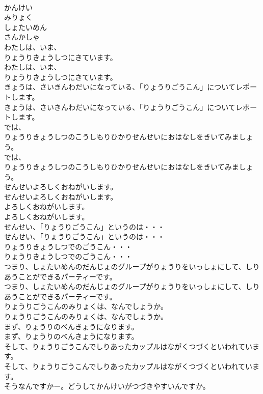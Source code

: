 \documentclass[8pt]{extreport}
\begin{document}
\begin{CJK}{UTF8}{min}
\\	かんけい
\\	みりょく
\\	しょたいめん
\\	さんかしゃ
\\	わたしは、いま、
\\	りょうりきょうしつにきています。
\\	わたしは、いま、
\\	りょうりきょうしつにきています。
\\	きょうは、さいきんわだいになっている、「りょうりごうこん」についてレポートします。
\\	きょうは、さいきんわだいになっている、「りょうりごうこん」についてレポートします。
\\	では、
\\	りょうりきょうしつのこうしもりひかりせんせいにおはなしをきいてみましょう。
\\	では、
\\	りょうりきょうしつのこうしもりひかりせんせいにおはなしをきいてみましょう。
\\	せんせいよろしくおねがいします。
\\	せんせいよろしくおねがいします。
\\	よろしくおねがいします。
\\	よろしくおねがいします。
\\	せんせい、「りょうりごうこん」というのは・・・
\\	せんせい、「りょうりごうこん」というのは・・・
\\	りょうりきょうしつでのごうこん・・・
\\	りょうりきょうしつでのごうこん・・・
\\	つまり、しょたいめんのだんじょのグループがりょうりをいっしょにして、しりあうことができるパーティーです。
\\	つまり、しょたいめんのだんじょのグループがりょうりをいっしょにして、しりあうことができるパーティーです。
\\	りょうりごうこんのみりょくは、なんでしょうか。
\\	りょうりごうこんのみりょくは、なんでしょうか。
\\	まず、りょうりのべんきょうになります。
\\	まず、りょうりのべんきょうになります。
\\	そして、りょうりごうこんでしりあったカップルはながくつづくといわれています。
\\	そして、りょうりごうこんでしりあったカップルはながくつづくといわれています。
\\	そうなんですかー。どうしてかんけいがつづきやすいんですか。

\end{CJK}
\end{document}
